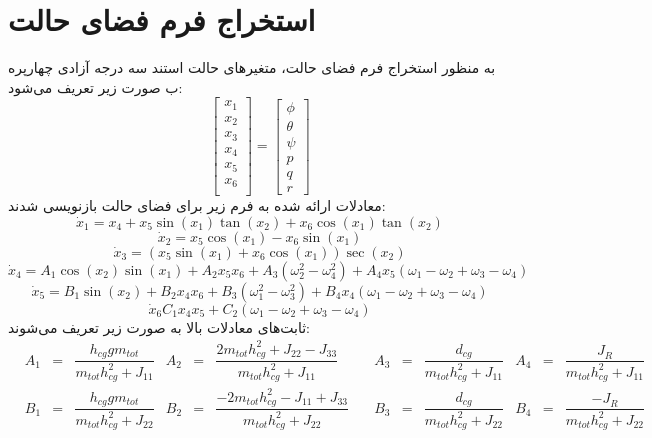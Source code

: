 \section{استخراج فرم فضای حالت}
به منظور استخراج فرم فضای حالت، متغیرهای حالت استند سه درجه آزادی چهارپره ب صورت زیر تعریف می‌شود:
\begin{equation}
	\begin{bmatrix}
		x_1\\x_2\\x_3\\x_4\\x_5\\x_6\\
	\end{bmatrix} = 
\begin{bmatrix}
	\phi\\ \theta \\ \psi \\ p\\ q\\ r
\end{bmatrix}
\end{equation}
معادلات ارائه شده به فرم زیر برای فضای حالت بازنویسی شدند:
\begin{equation}
	\dot x_1 = x_4 + x_5\sin(x_1)\tan(x_2) + x_6\cos(x_1)\tan(x_2)
\end{equation}
\begin{equation}
	\dot x_2 = x_5\cos(x_1)- x_6\sin(x_1)
\end{equation}
\begin{equation}
	\dot x_3 = (x_5\sin(x_1) + x_6\cos(x_1))\sec(x_2)
\end{equation}
\begin{equation}
	\dot x_4 = A_1\cos(x_2)\sin(x_1) + 
	A_2x_5x_6 + A_3\left(\omega_2^2-\omega_4^2\right)+
	A_4x_5\left(\omega_1-\omega_2+\omega_3-\omega_4\right)
\end{equation}
\begin{equation}
	\dot x_5 = B_1\sin(x_2) + 
	B_2x_4x_6 + B_3\left(\omega_1^2-\omega_3^2\right)+
	B_4x_4\left(\omega_1-\omega_2+\omega_3-\omega_4\right)
\end{equation}
\begin{equation}
	\dot x_6 C_1x_4x_5 + 
	C_2\left(\omega_1-\omega_2+\omega_3-\omega_4\right)
\end{equation}
ثابت‌های معادلات بالا  به صورت زیر تعریف می‌شوند:
\begin{align*}
	&A_1& =& \dfrac{h_{cg}gm_{tot}}{m_{tot}h_{cg}^2+J_{11}}
	&A_2& =& \dfrac{2m_{tot}h_{cg}^2+J_{22}-J_{33}}{m_{tot}h_{cg}^2+J_{11}}\quad
	&A_3& =& \dfrac{d_{cg}}{m_{tot}h_{cg}^2+J_{11}}
	&A_4& = &\dfrac{J_R}{m_{tot}h_{cg}^2+J_{11}}\\
	&B_1& =& \dfrac{h_{cg}gm_{tot}}{m_{tot}h_{cg}^2+J_{22}}
	&B_2& =& \dfrac{-2m_{tot}h_{cg}^2-J_{11}+J_{33}}{m_{tot}h_{cg}^2+J_{22}}\quad
	&B_3& =& \dfrac{d_{cg}}{m_{tot}h_{cg}^2+J_{22}}
	&B_4& = &\dfrac{-J_R}{m_{tot}h_{cg}^2+J_{22}}
\end{align*}
